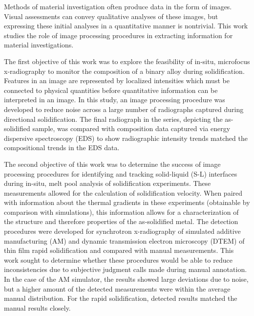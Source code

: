 Methods of material investigation often produce data in the form of
images. Visual assessments can convey qualitative analyses of these
images, but expressing these initial analyses in a quantitative manner is
nontrivial. This work studies the role of image processing procedures in
extracting information for material investigations.

The first objective of this work was to explore the feasibility of
in-situ, microfocus x-radiography to monitor the composition of a binary
alloy during solidification. Features in an image are represented by
localized intensities which must be connected to physical quantities
before quantitative information can be interpreted in an image. In this
study, an image processing procedure was developed to reduce noise across
a large number of radiographs captured during directional solidification.
The final radiograph in the series, depicting the as-solidified sample,
was compared with composition data captured via energy dispersive
spectroscopy (EDS) to show radiographic intensity trends matched the
compositional trends in the EDS data.

The second objective of this work was to determine the success of image
processing procedures for identifying and tracking solid-liquid (S-L)
interfaces during in-situ, melt pool analysis of solidification
experiments. These measurements allowed for the calculation of
solidification velocity. When paired with information about the thermal
gradients in these experiments (obtainable by comparison with
simulations), this information allows for a characterization of the
structure and therefore properties of the as-solidified metal. The
detection procedures were developed for synchrotron x-radiography of
simulated additive manufacturing (AM) and dynamic transmission electron
microscopy (DTEM) of thin film rapid solidification and compared with
manual measurements. This work sought to determine whether these
procedures would be able to reduce inconsistencies due to subjective
judgment calls made during manual annotation. In the case of the AM
simulator, the results showed large deviations due to noise, but a higher
amount of the detected measurements were within the average manual
distribution. For the rapid solidification, detected results matched the
manual results closely.

